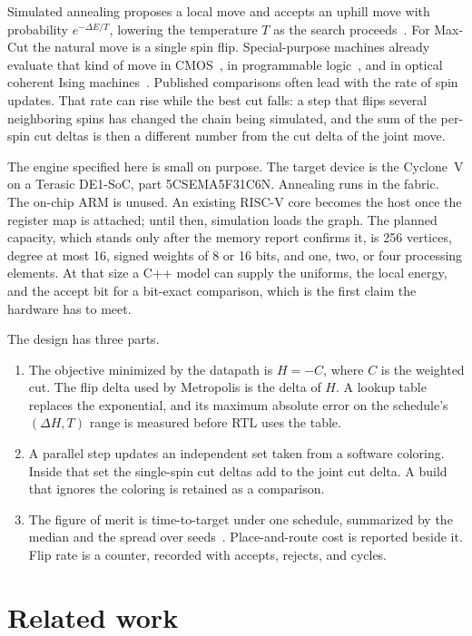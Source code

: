 \documentclass[10pt,twocolumn]{article}
\begin{document}
Simulated annealing proposes a local move and accepts an uphill move with probability \(e^{-\Delta E/T}\), lowering the temperature \(T\) as the search proceeds~\citep{metropolis1953,kirkpatrick1983}.
For Max-Cut the natural move is a single spin flip.
Special-purpose machines already evaluate that kind of move in CMOS~\citep{yamaoka2016,aramon2019}, in programmable logic~\citep{goto2019,tatsumura2019}, and in optical coherent Ising machines~\citep{inagaki2016}.
Published comparisons often lead with the rate of spin updates.
That rate can rise while the best cut falls: a step that flips several neighboring spins has changed the chain being simulated, and the sum of the per-spin cut deltas is then a different number from the cut delta of the joint move.

The engine specified here is small on purpose.
The target device is the Cyclone~V on a Terasic DE1-SoC, part 5CSEMA5F31C6N.
Annealing runs in the fabric.
The on-chip ARM is unused.
An existing RISC-V core becomes the host once the register map is attached; until then, simulation loads the graph.
The planned capacity, which stands only after the memory report confirms it, is 256 vertices, degree at most 16, signed weights of 8 or 16 bits, and one, two, or four processing elements.
At that size a C++ model can supply the uniforms, the local energy, and the accept bit for a bit-exact comparison, which is the first claim the hardware has to meet.

The design has three parts.
\begin{enumerate}
\item The objective minimized by the datapath is \(H=-C\), where \(C\) is the weighted cut.
  The flip delta used by Metropolis is the delta of \(H\).
  A lookup table replaces the exponential, and its maximum absolute error on the schedule's \((\Delta H,T)\) range is measured before RTL uses the table.
\item A parallel step updates an independent set taken from a software coloring.
  Inside that set the single-spin cut deltas add to the joint cut delta.
  A build that ignores the coloring is retained as a comparison.
\item The figure of merit is time-to-target under one schedule, summarized by the median and the spread over seeds~\citep{aiex2002}.
  Place-and-route cost is reported beside it.
  Flip rate is a counter, recorded with accepts, rejects, and cycles.
\end{enumerate}

\section{Related work}
\end{document}
